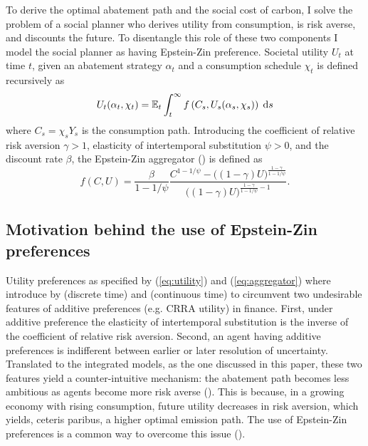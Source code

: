 \documentclass[../../main.tex]{subfiles}
\begin{document}
To derive the optimal abatement path and the social cost of carbon, I solve the problem of a social planner who derives utility from consumption, is risk averse, and discounts the future. To disentangle this role of these two components I model the social planner as having Epstein-Zin preference. Societal utility $U_t$ at time $t$, given an abatement strategy $\alpha_t$ and a consumption schedule $\chi_t$ is defined recursively as \begin{equation} \label{eq:utility}
    U_t(\alpha_t, \chi_t) = \operatorname{\mathbb{E}}_t \int^{\infty}_t f\left(C_s, U_s(\alpha_s, \chi_s)\right) \; \mathrm{d}s
\end{equation} where $C_s = \chi_s Y_s$ is the consumption path. Introducing the coefficient of relative risk aversion $\gamma > 1$, elasticity of intertemporal substitution $\psi > 0$, and the discount rate $\beta$, the Epstein-Zin aggregator (\cite{duffie_asset_1992}) is defined as \begin{equation} \label{eq:aggregator}
    f(C, U) = \frac{\beta}{1 - 1 / \psi} \frac{C^{1 - 1 / \psi} - \big((1- \gamma) U\big)^{\frac{1 - \gamma}{1 - 1 / \psi}}}{\big((1- \gamma) U\big)^{\frac{1 - \gamma}{1 - 1 / \psi} - 1}}.
\end{equation}

\subsection{Motivation behind the use of Epstein-Zin preferences}

Utility preferences as specified by (\ref{eq:utility}) and (\ref{eq:aggregator}) where introduce by  (discrete time) and  (continuous time) to circumvent two undesirable features of additive preferences (e.g. CRRA utility) in finance. First, under additive preference the elasticity of intertemporal substitution is the inverse of the coefficient of relative risk aversion. Second, an agent having additive preferences is indifferent between earlier or later resolution of uncertainty. Translated to the integrated models, as the one discussed in this paper, these two features yield a counter-intuitive mechanism: the abatement path becomes less ambitious as agents become more risk averse (\cite{pindyck_economic_2013}). This is because, in a growing economy with rising consumption, future utility decreases in risk aversion, which yields, ceteris paribus, a higher optimal emission path. The use of Epstein-Zin preferences is a common way to overcome this issue (\cite{pindyck_economic_2013, crost_optimal_2013, ackerman_epsteinzin_2013, hambel_optimal_2021,  olijslagers_discounting_2019}).
\end{document}
